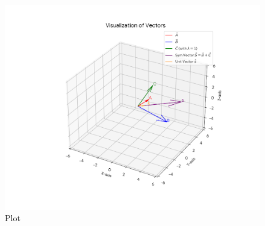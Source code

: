 \documentclass{beamer}
\begin{document}
\begin{figure}[H]
    \centering
    \includegraphics[width=0.7\columnwidth]{Fig.png}
    \caption{Plot}
    \label{fig:placeholder}
\end{figure}
\end{document}
